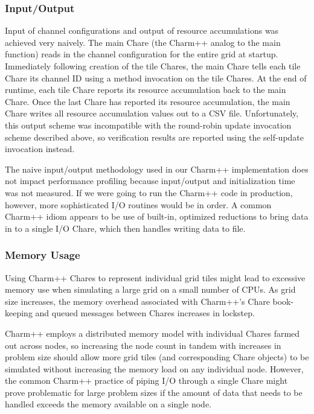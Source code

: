 \subsubsection{Input/Output}

Input of channel configurations and output of resource accumulations was achieved very naively.
The main Chare (the Charm++ analog to the main function) reads in the channel configuration for the entire grid at startup.
Immediately following creation of the tile Chares, the main Chare tells each tile Chare its channel ID using a method invocation on the tile Chares.
At the end of runtime, each tile Chare reports its resource accumulation back to the main Chare.
Once the last Chare has reported its resource accumulation, the main Chare writes all resource accumulation values out to a CSV file.
Unfortunately, this output scheme was incompatible with the round-robin update invocation scheme described above, so verification results are reported using the self-update invocation instead.

The naive input/output methodology used in our Charm++ implementation does not impact performance profiling because input/output and initialization time was not measured.
If we were going to run the Charm++ code in production, however, more sophisticated I/O routines would be in order.
A common Charm++ idiom appears to be use of built-in, optimized reductions to bring data in to a single I/O Chare, which then handles writing data to file.

\subsubsection{Memory Usage}

Using Charm++ Chares to represent individual grid tiles might lead to excessive memory use when simulating a large grid on a small number of CPUs.
As grid size increases, the memory overhead associated with Charm++'s Chare book-keeping and queued messages between Chares increases in lockstep.

Charm++ employs a distributed memory model with individual Chares farmed out across nodes, so increasing the node count in tandem with increases in problem size should allow more grid tiles (and corresponding Chare objects) to be simulated without increasing the memory load on any individual node.
However, the common Charm++ practice of piping I/O through a single Chare might prove problematic for large problem sizes if the amount of data that needs to be handled exceeds the memory available on a single node.

